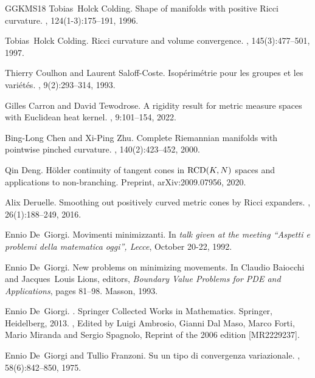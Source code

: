 \documentclass[11pt]{article}
\numberwithin{equation}{section}
\begin{document}
{\begin{thebibliography}{GGKMS18}
Tobias~Holck Colding.
\newblock Shape of manifolds with positive {R}icci curvature.
, 124(1-3):175--191, 1996.

Tobias~Holck Colding.
\newblock Ricci curvature and volume convergence.
, 145(3):477--501, 1997.

Thierry Coulhon and Laurent Saloff-Coste.
\newblock Isop\'{e}rim\'{e}trie pour les groupes et les vari\'{e}t\'{e}s.
, 9(2):293--314, 1993.

Gilles Carron and David Tewodrose.
\newblock A rigidity result for metric measure spaces with {E}uclidean heat
  kernel.
, 9:101--154, 2022.

Bing-Long Chen and Xi-Ping Zhu.
\newblock Complete {R}iemannian manifolds with pointwise pinched curvature.
, 140(2):423--452, 2000.

Qin Deng.
\newblock H\"older continuity of tangent cones in {${\rm RCD}(K,N)$} spaces and
  applications to non-branching.
\newblock Preprint, arXiv:2009.07956, 2020.

Alix Deruelle.
\newblock Smoothing out positively curved metric cones by {R}icci expanders.
, 26(1):188--249, 2016.

Ennio De~Giorgi.
\newblock Movimenti minimizzanti.
\newblock In {\em talk given at the meeting ``Aspetti e problemi della
  matematica oggi'', {L}ecce}, October 20-22, 1992.

Ennio De~Giorgi.
\newblock New problems on minimizing movements.
\newblock In Claudio Baiocchi and Jacques~Louis Lions, editors, {\em Boundary
  Value Problems for PDE and Applications}, pages 81--98. Masson, 1993.

Ennio De~Giorgi.
.
\newblock Springer Collected Works in Mathematics. Springer, Heidelberg, 2013.
, Edited by Luigi Ambrosio,
  Gianni Dal Maso, Marco Forti, Mario Miranda and Sergio Spagnolo, Reprint of
  the 2006 edition [MR2229237].

Ennio De~Giorgi and Tullio Franzoni.
\newblock Su un tipo di convergenza variazionale.
,
  58(6):842--850, 1975.


\end{thebibliography}}
\end{document}

